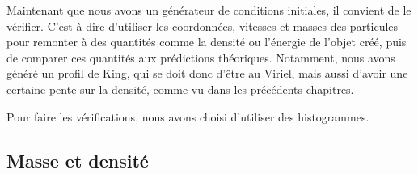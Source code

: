 Maintenant que nous avons un générateur de conditions initiales, il convient de
le vérifier. C'est-à-dire d'utiliser les coordonnées, vitesses et masses des
particules pour remonter à des quantités comme la densité ou l'énergie de
l'objet créé, puis de comparer ces quantités aux prédictions théoriques.
Notamment, nous avons généré un profil de King, qui se doit donc d'être au
Viriel, mais aussi d'avoir une certaine pente sur la densité, comme vu dans les
précédents chapitres.

Pour faire les vérifications, nous avons choisi d'utiliser des histogrammes.

\subsection{Masse et densité}


